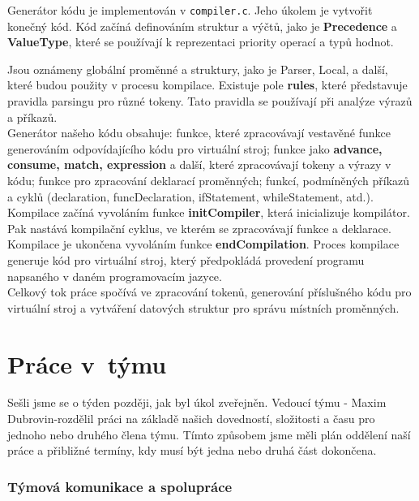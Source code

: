 \documentclass[a4paper, 11pt]{article}
\begin{document}
        Generátor kódu je implementován v \texttt{compiler.c}. Jeho úkolem je vytvořit
        konečný kód. Kód začíná definováním struktur a výčtů, jako je \textbf{Precedence} a \textbf{ValueType}, které se používají k reprezentaci priority operací a typů hodnot.

        Jsou oznámeny globální proměnné a struktury, jako je Parser, Local, a další, které budou použity v procesu kompilace. Existuje pole \textbf{rules}, které představuje pravidla parsingu pro různé tokeny. Tato pravidla se používají při analýze výrazů a příkazů.\\
        Generátor našeho kódu obsahuje: funkce, které zpracovávají vestavěné funkce generováním odpovídajícího kódu pro virtuální stroj; funkce jako \textbf{advance, consume, match, expression} a další, které zpracovávají tokeny a výrazy v kódu; funkce pro zpracování deklarací proměnných; funkcí, podmíněných příkazů a cyklů (declaration, funcDeclaration, ifStatement, whileStatement, atd.).\\
        Kompilace začíná vyvoláním funkce \textbf{initCompiler}, která inicializuje kompilátor. Pak nastává kompilační cyklus, ve kterém se zpracovávají funkce a deklarace.
        Kompilace je ukončena vyvoláním funkce \textbf{endCompilation}.
        Proces kompilace generuje kód pro virtuální stroj, který předpokládá provedení programu napsaného v daném programovacím jazyce.\\

        
        Celkový tok práce spočívá ve zpracování tokenů, generování příslušného kódu pro virtuální stroj a vytváření datových struktur pro správu místních proměnných.


	\section{Práce v~týmu}

        Sešli jsme se o týden později, jak byl úkol zveřejněn. Vedoucí týmu - Maxim Dubrovin-rozdělil práci na základě našich dovedností, složitosti a času pro jednoho nebo druhého člena týmu. Tímto způsobem jsme měli plán oddělení naší práce a přibližné termíny, kdy musí být jedna nebo druhá část dokončena.

	\subsubsection{Týmová komunikace a spolupráce}
\end{document}
